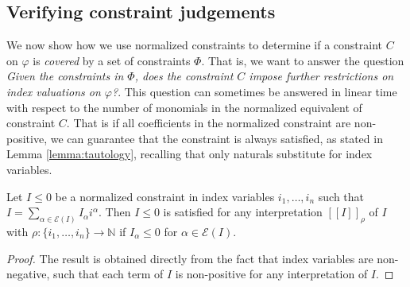\subsection{Verifying constraint judgements}
We now show how we use normalized constraints to determine if a constraint $C$ on $\varphi$ is \textit{covered} by a set of constraints $\Phi$. That is, we want to answer the question \textit{Given the constraints in $\Phi$, does the constraint $C$ impose further restrictions on index valuations on $\varphi$?}. This question can sometimes be answered in linear time with respect to the number of monomials in the normalized equivalent of constraint $C$. That is if all coefficients in the normalized constraint are non-positive, we can guarantee that the constraint is always satisfied, as stated in Lemma \ref{lemma:tautology}, recalling that only naturals substitute for index variables.
%
\begin{lemma}\label{lemma:tautology}
Let $I \leq 0$ be a normalized constraint in index variables $i_1,\dots,i_n$ such that $I = \sum_{\alpha\in\mathcal{E}(I)} I_\alpha i^\alpha$. Then $I \leq 0$ is satisfied for any interpretation $[\![I]\!]_\rho$ of $I$ with $\rho : \{i_1,\dots,i_n\} \longrightarrow \mathbb{N}$ if $I_\alpha \leq 0$ for $\alpha\in\mathcal{E}(I)$.
\begin{proof}
The result is obtained directly from the fact that index variables are non-negative, such that each term of $I$ is non-positive for any interpretation of $I$.
\end{proof}
\end{lemma}
%
%
